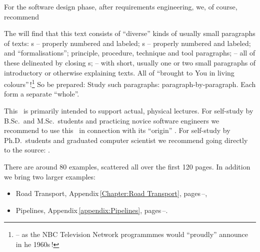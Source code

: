 
\begynd
\pind For the software design phase, after requirements engineering,
\pind we, of course, recommend \cite[
      ols.\,1--2]{TheSEBook1,TheSEBook2} 
\afslut

\label{The Structuring of The Text}

\begynd
\pind The  will find that this text consists of
      ``diverse'' kinds of usually small paragraphs of texts:
\begynd
\pind {}s -- properly numbered and labeled;
\pind {}s -- properly numbered and labeled;
\pind {} and
       ``formalisations'';
\pind {} principle, procedure, technique and tool paragraphs;
\pind -- all of these delineated by closing {\dbsquare}s;
\pind -- with short, usually one or two small paragraphs of
      introductory or otherwise explaining texts.
\afslut
\pind All of  \textsf{``brought to You in living
  colours''\,!}\footnote{\LLLL -- as the \textsf{NBC} Television
  Network programmmes would ``proudly'' announce in he 1960s\,!}
\pind So be prepared:
\begynd
\pind Study such paragraphs: paragraph-by-paragraph.
\pind Each form a separate ``whole''.
\afslut
\afslut


\label{sec:Used for Self-Study}

\begynd
\pind This \primer\ is primarily intended to support actual, physical lectures.
\pind For self-study by B.Sc.\ and M.Sc.\ students and practicing
      novice software engineers  we recommend to use this \primer\ in
      connection with its ``origin'' \cite{BjornerMonograph2020}.
\pind For  self-study by Ph.D.\ students and graduated computer
      scientist we recommend going directly to the source:
      \cite{BjornerMonograph2020}.   
\afslut

\label{primer:Two Examples}

\begynd
\pind There are around 80 examples, scattered all over the first 120 pages.
\pind In addition we bring two larger examples:
\afslut
\begin{itemize}
\item \textsf{Road Transport}, Appendix\,\ref{Chapter:Road
        Transport}, pages\,\pageref{Chapter:Road Transport}--\pageref{p-ch:Road Transport.n}, 
\item \textsf{Pipelines},
      Appendix\,\ref{appendix:Pipelines}, pages\,\pageref{appendix:Pipelines}--\pageref{appendix:Pipelines.n}. 
\end{itemize}

